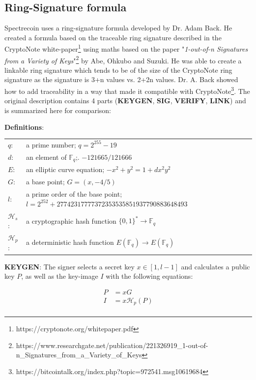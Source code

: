 \subsection{Ring-Signature formula}
Spectrecoin uses a ring-signature formula developed by Dr. Adam Back. He 
created a formula based on the traceable ring signature described in the 
CryptoNote white-paper\footnote{https://cryptonote.org/whitepaper.pdf} 
using maths based on the paper "\textit{1-out-of-n Signatures from a Variety of Keys}"\footnote{https://www.researchgate.net/publication/221326919\_1-out-of-n\_Signatures\_from\_a\_Variety\_of\_Keys} 
by Abe, Ohkubo and Suzuki. He was able to create a linkable ring signature 
which tends to be  of the size of the CryptoNote ring signature 
as the signature is 3+n values vs. 2+2n values.
\newpage
\noindent
Dr. A. Back showed how to add traceability in a way that made it compatible with CryptoNote\footnote{https://bitcointalk.org/index.php?topic=972541.msg10619684}. 
The original description contains 4 parts (\textbf{KEYGEN}, \textbf{SIG}, 
\textbf{VERIFY}, \textbf{LINK}) and is summarized here for comparison:


\hfill \break\textbf{Definitions}:
 
\begin{tabular}{ll}
	$q$:   & a prime number; $q = 2^{255} - 19$\\
	$d$:   & an element of $\mathbb{F}_q$;. $-121665/121666$ \\
	$E$:   & an elliptic curve equation; $-x^2 + y^2 = 1 + dx^2y^2$ \\
	$G$:   & a base point; $G=(x, -4/5)$ \\
	$l$:   & a prime order of the base point; $l=2^{252}+27742317777372353535851937790883648493$ \\
	$\mathcal{H}_s$:   & a cryptographic hash function $\{0,1\}^* \rightarrow \mathbb{F}_q$ \\
	$\mathcal{H}_p$:   & a deterministic hash function $E(\mathbb{F}_q) \rightarrow E(\mathbb{F}_q)$ \\	
\end{tabular}

\hfill \break


\hfill \break\textbf{KEYGEN}: 
The signer selects a secret key $x \in [1, l-1]$ and calculates a public 
key $P$, as well as the key-image $I$ with the following equations:

\begin{equation}
\begin{split}
P &= xG\\
I &= x\mathcal{H}_p(P)\\ 
\end{split}
\end{equation}

